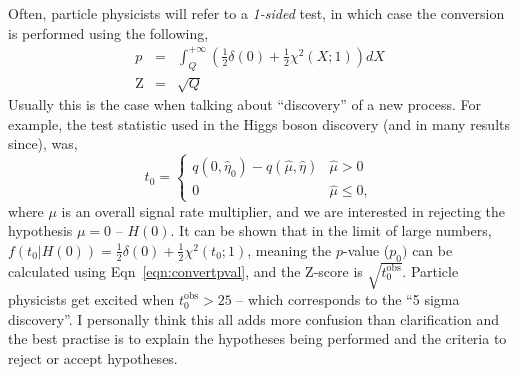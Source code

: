 Often, particle physicists will refer to a \emph{1-sided} test, in which case the conversion is performed using the following, 
\begin{eqnarray}\label{eqn:convertpval}
    p & = & \int_{Q}^{+\infty}\left(\frac{1}{2}\delta(0)+\frac{1}{2}\chi^{2}(X;1)\right)dX \\
    \mathrm{Z}& = & \sqrt{Q}
\end{eqnarray} 
Usually this is the case when talking about ``discovery'' of a new process. For example, the test statistic used in the Higgs boson discovery (and in many results since), was, 
\begin{equation}
    t_{0} = \begin{cases}
                q(0,\hat{\eta}_{0})-q(\hat{\mu},\hat{\eta})    & \hat{\mu} > 0 \\
                0               & \hat{\mu}\leq 0,
                \end{cases}
\end{equation}
where $\mu$ is an overall signal rate multiplier, and we are interested in rejecting the hypothesis $\mu=0$ -- $H(0)$. It can be shown that in the limit of large numbers, $f(t_{0}|H(0)) = \frac{1}{2}\delta(0)+\frac{1}{2}\chi^{2}(t_0;1)$, meaning the $p$-value ($p_{0})$ can be calculated using Eqn~\ref{eqn:convertpval}, and the Z-score is $\sqrt{t^{\mathrm{obs}}_{0}}$. Particle physicists get excited when $t_{0}^{\mathrm{obs}}>25$ -- which corresponds to the ``5 sigma discovery''. I personally think this all adds more confusion than clarification and the best practise is to explain the hypotheses being performed and the criteria to reject or accept hypotheses. 

